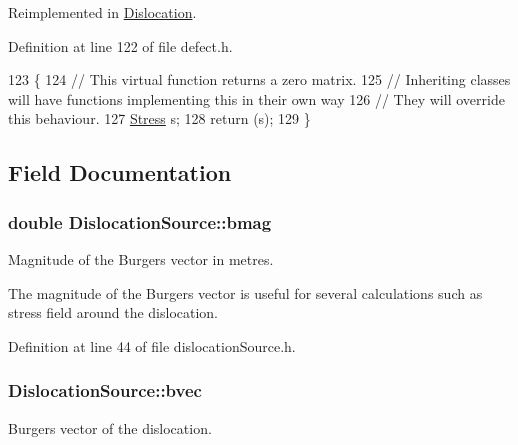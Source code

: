 Reimplemented in \hyperlink{classDislocation_af61cedf5305080ce0f55eb7177efe529}{Dislocation}.



Definition at line 122 of file defect.\-h.


\begin{DoxyCode}
123   \{
124     \textcolor{comment}{// This virtual function returns a zero matrix.}
125     \textcolor{comment}{// Inheriting classes will have functions implementing this in their own way}
126     \textcolor{comment}{// They will override this behaviour.}
127     \hyperlink{classStress}{Stress} s;
128     \textcolor{keywordflow}{return} (s);
129   \}
\end{DoxyCode}


\subsection{Field Documentation}
\hypertarget{classDislocationSource_a59c95f3cb5af5180d2c42792413f7816}{
\subsubsection[{bmag}]{\setlength{\rightskip}{0pt plus 5cm}double Dislocation\-Source\-::bmag\hspace{0.3cm}{\ttfamily [protected]}}}\label{de/de3/classDislocationSource_a59c95f3cb5af5180d2c42792413f7816}


Magnitude of the Burgers vector in metres. 

The magnitude of the Burgers vector is useful for several calculations such as stress field around the dislocation. 

Definition at line 44 of file dislocation\-Source.\-h.

\hypertarget{classDislocationSource_ade4753ac6106317c693c2bba4f83a568}{
\subsubsection[{bvec}]{ Dislocation\-Source\-::bvec\hspace{0.3cm}{\ttfamily [protected]}}}\label{de/de3/classDislocationSource_ade4753ac6106317c693c2bba4f83a568}


Burgers vector of the dislocation. 



